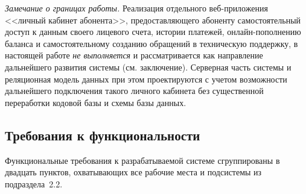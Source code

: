 \emph{Замечание о границах работы.} Реализация отдельного веб-приложения <<личный кабинет абонента>>, предоставляющего абоненту самостоятельный доступ к данным своего лицевого счета, истории платежей, онлайн-пополнению баланса и самостоятельному созданию обращений в техническую поддержку, в настоящей работе \emph{не выполняется} и рассматривается как направление дальнейшего развития системы (см. заключение). Серверная часть системы и реляционная модель данных при этом проектируются с учетом возможности дальнейшего подключения такого личного кабинета без существенной переработки кодовой базы и схемы базы данных.

\subsection{Требования к функциональности}

Функциональные требования к разрабатываемой системе сгруппированы в двадцать пунктов, охватывающих все рабочие места и подсистемы из подраздела~2.2.

